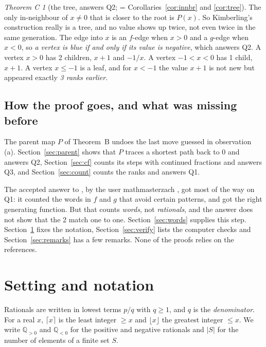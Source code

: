 \documentclass[11pt]{article}
\theoremstyle{definition}
\theoremstyle{remark}
\newtheorem*{thmC}{Theorem C}
\newcommand{\Q}{\mathbb{Q}}
\newcommand{\Qpos}{\Q_{>0}}
\newcommand{\Qneg}{\Q_{<0}}
\begin{document}
\begin{thmC}[the tree, answers Q2; = Corollaries~\ref{cor:innbr} and \ref{cor:tree}]
The only in-neighbour of $x\neq0$ that is closer to the root is $P(x)$. So Kimberling's
construction really is a tree, and no value shows up twice, not even twice in the same generation.
The edge into $x$ is an $f$-edge when $x>0$ and a $g$-edge when $x<0$, so \emph{a vertex is blue if
and only if its value is negative}, which answers Q2. A vertex $x>0$ has 2 children, $x+1$ and
$-1/x$. A vertex $-1<x<0$ has 1 child, $x+1$. A vertex $x\le-1$ is a leaf, and for $x<-1$ the
value $x+1$ is not new but appeared exactly \emph{3 ranks earlier}.
\end{thmC}

\subsection{How the proof goes, and what was missing before}

The parent map $P$ of Theorem~B undoes the last move guessed in observation (a).
Section~\ref{sec:parent} shows that $P$ traces a shortest path back to $0$ and answers Q2,
Section~\ref{sec:cf} counts its steps with continued fractions and answers Q3, and
Section~\ref{sec:count} counts the ranks and answers Q1.

The accepted answer to \cite{kagey-mse}, by the user mathmasterzach \cite{mmz}, got most of the
way on Q1: it counted the words in $f$ and $g$ that avoid certain patterns, and got the right
generating function. But that counts \emph{words}, not \emph{rationals}, and the answer does not
show that the 2 match one to one. Section~\ref{sec:words} supplies this step. Section~\ref{sec:setup} fixes the notation, Section~\ref{sec:verify} lists the
computer checks and Section~\ref{sec:remarks} has a few remarks. None of the proofs relies on the
references.

\section{Setting and notation}\label{sec:setup}

Rationals are written in lowest terms $p/q$ with $q\ge1$, and $q$ is the \emph{denominator}. For a
real $x$, $\lceil x\rceil$ is the least integer $\ge x$ and $\lfloor x\rfloor$ the greatest integer
$\le x$. We write $\Qpos$ and $\Qneg$ for the positive and negative rationals and $|S|$ for the
number of elements of a finite set $S$.
\end{document}
